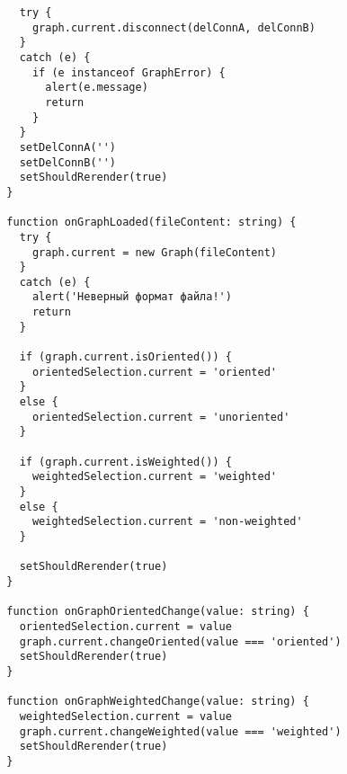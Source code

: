 \begin{verbatim}
    try {
      graph.current.disconnect(delConnA, delConnB)
    }
    catch (e) {
      if (e instanceof GraphError) {
        alert(e.message)
        return
      }
    }
    setDelConnA('')
    setDelConnB('')
    setShouldRerender(true)
  }

  function onGraphLoaded(fileContent: string) {
    try {
      graph.current = new Graph(fileContent)
    }
    catch (e) {
      alert('Неверный формат файла!')
      return
    }

    if (graph.current.isOriented()) {
      orientedSelection.current = 'oriented'
    }
    else {
      orientedSelection.current = 'unoriented'
    }

    if (graph.current.isWeighted()) {
      weightedSelection.current = 'weighted'
    }
    else {
      weightedSelection.current = 'non-weighted'
    }

    setShouldRerender(true)
  }

  function onGraphOrientedChange(value: string) {
    orientedSelection.current = value
    graph.current.changeOriented(value === 'oriented')
    setShouldRerender(true)
  }

  function onGraphWeightedChange(value: string) {
    weightedSelection.current = value
    graph.current.changeWeighted(value === 'weighted')
    setShouldRerender(true)
  }


\end{verbatim}
